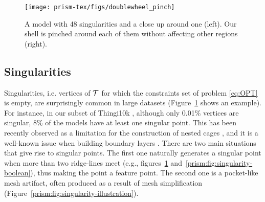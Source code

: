 

\begin{figure}
    \centering
    \texttt{[image: prism-tex/figs/doublewheel\_pinch]}
    \caption{A model with 48 singularities and a close up around one (left).
    Our shell is pinched around each of them without affecting other regions (right).}
    \label{prism:fig:singularity_example}
    
\end{figure}


\subsection{Singularities}\label{prism:sec:singularities}


Singularities, i.e. vertices of $\mathcal{T}$ for which the constraints set of problem \eqref{eq:OPT} is empty, are surprisingly common in large datasets (Figure~\ref{prism:fig:singularity_example} shows an example). For instance, in our subset of Thingi10k \cite{zhou2016thingi10k}, although only 0.01\% vertices are singular,  8\% of the models have at least one singular point. This has been recently observed as a limitation for the construction of nested cages \cite[Appendix A]{sacht2015nested}, and it is a well-known issue when building boundary layers \cite{aubry2015most,aubry2017boundary,garimella2000boundary}.
%
There are two main situations that give rise to singular points. 
The first one naturally generates a singular point when more than two ridge-lines meet (e.g., figures~\ref{prism:fig:singularity_example} and~\ref{prism:fig:singularity-boolean}), thus making the point a feature point. 
The second one is a pocket-like mesh artifact, often produced as a result of mesh simplification (Figure~\ref{prism:fig:singularity-illustration}).

